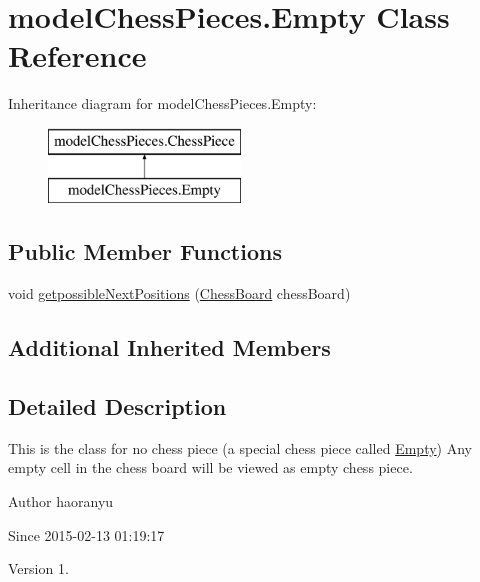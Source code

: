 \hypertarget{classmodel_chess_pieces_1_1_empty}{\section{model\+Chess\+Pieces.\+Empty Class Reference}
\label{classmodel_chess_pieces_1_1_empty}
}
Inheritance diagram for model\+Chess\+Pieces.\+Empty\+:\begin{figure}[H]
\begin{center}
\leavevmode
\includegraphics[height=2.000000cm]{classmodel_chess_pieces_1_1_empty}
\end{center}
\end{figure}
\subsection*{Public Member Functions}
\begin{DoxyCompactItemize}
\item 
void \hyperlink{classmodel_chess_pieces_1_1_empty_a4f54633e5423f531e40b8bb76f5549ea}{getpossible\+Next\+Positions} (\hyperlink{classmodel_core_1_1_chess_board}{Chess\+Board} chess\+Board)
\end{DoxyCompactItemize}
\subsection*{Additional Inherited Members}


\subsection{Detailed Description}
This is the class for no chess piece (a special chess piece called \hyperlink{classmodel_chess_pieces_1_1_empty}{Empty}) Any empty cell in the chess board will be viewed as empty chess piece. \begin{DoxyAuthor}{Author}
haoranyu 
\end{DoxyAuthor}
\begin{DoxySince}{Since}
2015-\/02-\/13 01\+:19\+:17 
\end{DoxySince}
\begin{DoxyVersion}{Version}
1. 
\end{DoxyVersion}



